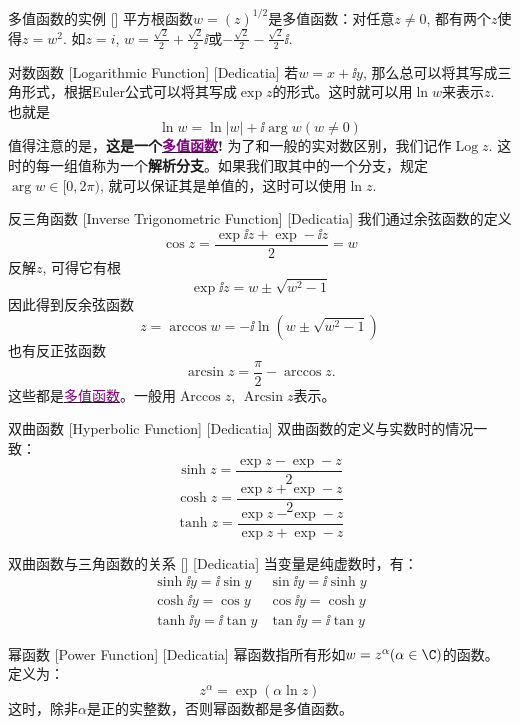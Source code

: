 \documentclass[UTF8]{ctexart}
\newcommand{\hyperrefc}[2]{\hyperref[#1]{\textcolor{purple}{#2}}}
\DeclareMathOperator{\Log}{Log}
\begin{document}
\begin{xmp}
    {多值函数的实例}
    []
    平方根函数$w=(z)^{1/2}$是多值函数：对任意$z\neq 0$, 都有两个$z$使得$z=w^2$. 如$z=i$, $w=\frac{\sqrt{2}}{2}+\frac{\sqrt{2}}{2}\ii$或$-\frac{\sqrt{2}}{2}-\frac{\sqrt{2}}{2}\ii$.
\end{xmp}
\begin{dfn}
    [Logarithmic]
    {对数函数}
    [Logarithmic Function]
    [Dedicatia]
    若$w=x+\ii y$, 那么总可以将其写成三角形式，根据Euler公式可以将其写成$\exp z$的形式。这时就可以用$\ln w$来表示$z$. 也就是
    \[\ln w=\ln|w|+\ii\arg w (w\neq 0)\]
    值得注意的是，\textbf{这是一个\hyperrefc{dfn:Multivalued}{多值函数}! }为了和一般的实对数区别，我们记作$\Log z$. 这时的每一组值称为一个\textbf{解析分支}。如果我们取其中的一个分支，规定$\arg w\in[0,2\pi)$, 就可以保证其是单值的，这时可以使用$\ln z$.
\end{dfn}
\begin{dfn}
    [InverseTriangular]
    {反三角函数}
    [Inverse Trigonometric Function]
    [Dedicatia]
    我们通过余弦函数的定义
    \[\cos z=\frac{\exp\ii z+\exp -\ii z}{2}=w\]
    反解$z$, 可得它有根
    \[\exp\ii z=w\pm\sqrt{w^2-1}\]
    因此得到反余弦函数
    \[z=\arccos w=-\ii\ln(w\pm\sqrt{w^2-1})\]
    也有反正弦函数
    \[\arcsin z=\frac{\pi}{2}-\arccos z.\]
    这些都是\hyperrefc{dfn:Multivalued}{多值函数}。一般用$\operatorname{Arccos}z$, $\operatorname{Arcsin}z$表示。\\
\end{dfn}
\begin{dfn}
    [HyperbolicFunction]
    {双曲函数}
    [Hyperbolic Function]
    [Dedicatia]
    双曲函数的定义与实数时的情况一致：
    \[\sinh z=\frac{\exp z-\exp -z}{2}\]
    \[\cosh z=\frac{\exp z+\exp -z}{2}\]
    \[\tanh z=\frac{\exp z-\exp -z}{\exp z+\exp -z}\]
\end{dfn}
\begin{ppt}
    [UUID]
    {双曲函数与三角函数的关系}
    []
    [Dedicatia]
    当变量是纯虚数时，有：
    \[\begin{array}{cc}
        \sinh\ii y=\ii\sin y&\sin\ii y=\ii\sinh y\\
        \cosh\ii y=\cos y&\cos\ii y=\cosh y\\
        \tanh\ii y=\ii\tan y&\tan\ii y=\ii\tan y
    \end{array}\]
\end{ppt}
\begin{dfn}
    [UUID]
    {幂函数}
    [Power Function]
    [Dedicatia]
    幂函数指所有形如$w=z^\alpha (\alpha\in\C)$的函数。定义为：
    \[z^\alpha = \exp(\alpha \ln z)\]
    这时，除非$\alpha$是正的实整数，否则幂函数都是多值函数。
\end{dfn}
\end{document}
